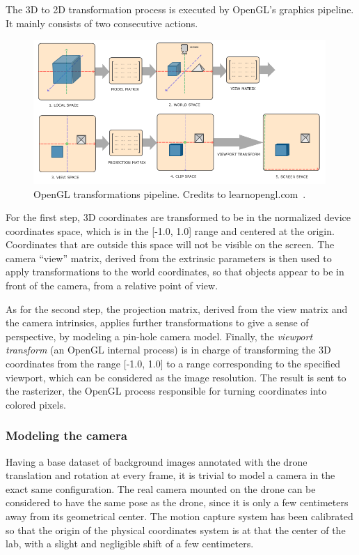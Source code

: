 The 3D to 2D transformation process is executed by OpenGL's graphics pipeline.
It mainly consists of two consecutive actions.

\begin{figure}[h]
	\center
	\includegraphics[width=0.99\textwidth]{figure/pipeline.png}
	\caption[OpenGL transformations pipeline]{OpenGL transformations
	pipeline. Credits to learnopengl.com~\cite{LearnOpenGL}.}
	\label{fig:openglpipeline}
\end{figure}

For the first step, 3D coordinates are transformed to be in the normalized
device coordinates space, which is in the [-1.0, 1.0] range and centered at the
origin. Coordinates that are outside this space will not be visible on the
screen.  The camera ``view'' matrix, derived from the extrinsic parameters is
then used to apply transformations to the world coordinates, so that objects
appear to be in front of the camera, from a relative point of view.

As for the second step, the projection matrix, derived from the view matrix and
the camera intrinsics, applies further transformations to give a sense of
perspective, by modeling a pin-hole camera model. Finally, the \emph{viewport
transform} (an OpenGL internal process) is in charge of transforming the 3D
coordinates from the range [-1.0, 1.0] to a range corresponding to the
specified viewport, which can be considered as the image resolution. The result
is sent to the rasterizer, the OpenGL process responsible for turning
coordinates into colored pixels.


	\subsubsection{Modeling the camera}

Having a base dataset of background images annotated with the drone translation
and rotation at every frame, it is trivial to model a camera in the exact same
configuration. The real camera mounted on the drone can be considered to have
the same pose as the drone, since it is only a few centimeters away from its
geometrical center. The motion capture system has been calibrated so that the
origin of the physical coordinates system is at that the center of the lab,
with a slight and negligible shift of a few centimeters.\\

